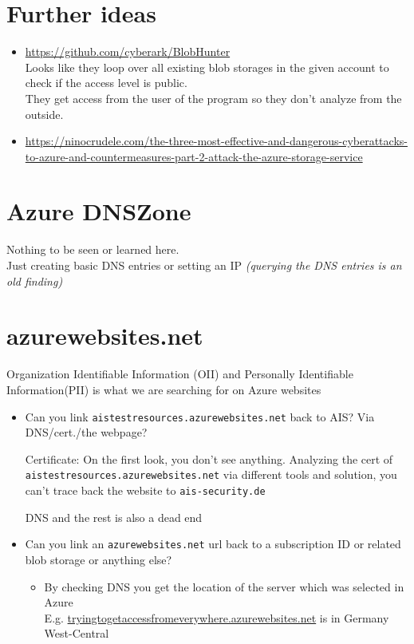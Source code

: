 \documentclass[12pt]{article}
\begin{document}
\section*{Further ideas}
\begin{itemize}
    \item \url{https://github.com/cyberark/BlobHunter} \\
    Looks like they loop over all existing blob storages in the given account to check if the access level is public. \\
    They get access from the user of the program so they don't analyze from the outside.
    \item \url{https://ninocrudele.com/the-three-most-effective-and-dangerous-cyberattacks-to-azure-and-countermeasures-part-2-attack-the-azure-storage-service}
\end{itemize}


\section*{Azure DNSZone}
Nothing to be seen or learned here. \\
Just creating basic DNS entries or setting an IP \textit{(querying the DNS entries is an old finding)}


\section*{azurewebsites.net}
Organization Identifiable Information (OII) and Personally Identifiable Information(PII) is what we are searching for on Azure websites
\begin{itemize}
    \item Can you link \verb|aistestresources.azurewebsites.net| back to AIS? Via DNS/cert./the webpage? 
    
    Certificate: On the first look, you don't see anything. Analyzing the cert of \verb|aistestresources.azurewebsites.net| via different tools and solution, you can't trace back the website to \verb|ais-security.de|

    DNS and the rest is also a dead end
    
    \item Can you link an \verb|azurewebsites.net| url back to a subscription ID or related blob storage or anything else? 
    \begin{itemize}
        \item By checking DNS you get the location of the server which was selected in Azure \\
        E.g. \url{tryingtogetaccessfromeverywhere.azurewebsites.net} is in Germany West-Central
    \end{itemize}

\end{itemize}
\end{document}
